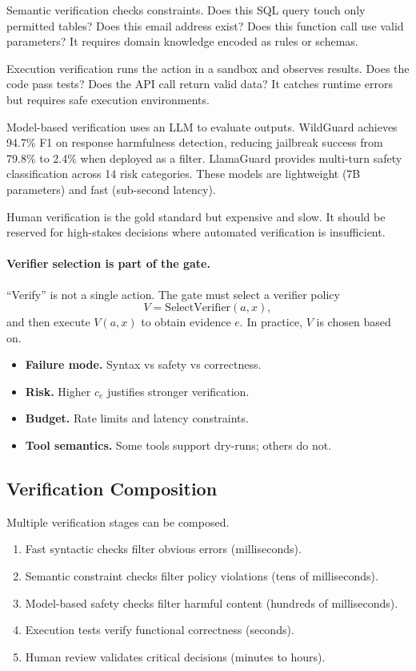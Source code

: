Semantic verification checks constraints. Does this SQL query touch only permitted tables? Does this email address exist? Does this function call use valid parameters? It requires domain knowledge encoded as rules or schemas.

Execution verification runs the action in a sandbox and observes results. Does the code pass tests? Does the API call return valid data? It catches runtime errors but requires safe execution environments.

Model-based verification uses an LLM to evaluate outputs. WildGuard \cite{han2024wildguard} achieves 94.7\% F1 on response harmfulness detection, reducing jailbreak success from 79.8\% to 2.4\% when deployed as a filter. LlamaGuard provides multi-turn safety classification across 14 risk categories. These models are lightweight (7B parameters) and fast (sub-second latency).

Human verification is the gold standard but expensive and slow. It should be reserved for high-stakes decisions where automated verification is insufficient.

\paragraph{Verifier selection is part of the gate.}
``Verify'' is not a single action. The gate must select a verifier policy
\[
V = \text{SelectVerifier}(a, x),
\]
and then execute $V(a, x)$ to obtain evidence $e$. In practice, $V$ is chosen based on.
\begin{itemize}
\item \textbf{Failure mode.} Syntax vs safety vs correctness.
\item \textbf{Risk.} Higher $c_e$ justifies stronger verification.
\item \textbf{Budget.} Rate limits and latency constraints.
\item \textbf{Tool semantics.} Some tools support dry-runs; others do not.
\end{itemize}

\subsection{Verification Composition}

Multiple verification stages can be composed.

\begin{enumerate}
\item Fast syntactic checks filter obvious errors (milliseconds).
\item Semantic constraint checks filter policy violations (tens of milliseconds).
\item Model-based safety checks filter harmful content (hundreds of milliseconds).
\item Execution tests verify functional correctness (seconds).
\item Human review validates critical decisions (minutes to hours).
\end{enumerate}

